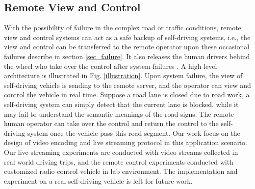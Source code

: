 \subsection{Remote View and Control}


With the possibility of failure in the complex road or traffic
conditions, remote view and control systems can act as a safe backup
of self-driving systems, 
i.e., the view and control can be transferred to the remote
operator upon these occasional failures describe in section \ref{sec_failure}. 
It also releases the human drivers behind the wheel who take over the 
control after system failures \cite{waymo}. 
A high level architecture is illustrated in Fig. \ref{illustration}.  
Upon system failure, the view of self-driving vehicle
is sending to the remote server, 
and the operator can view and control the vehicle in real time. 
Suppose a road lane is closed due to road work, 
a self-driving system can simply detect
that the current lane is blocked,
while it may fail to understand the semantic meanings
of the road signs. 
The remote human operator can take over the control and 
return the control to the self-driving system once the vehicle pass this road segment. 
Our work focus on the design of video encoding and live streaming protocol
in this application scenario. 
Our live streaming experiments are conducted with video streams
collected in real world driving trips, 
and the remote control experiments conducted with customized 
radio control vehicle in lab environment. 
The implementation and experiment on a real self-driving vehicle 
is left for future work. 




